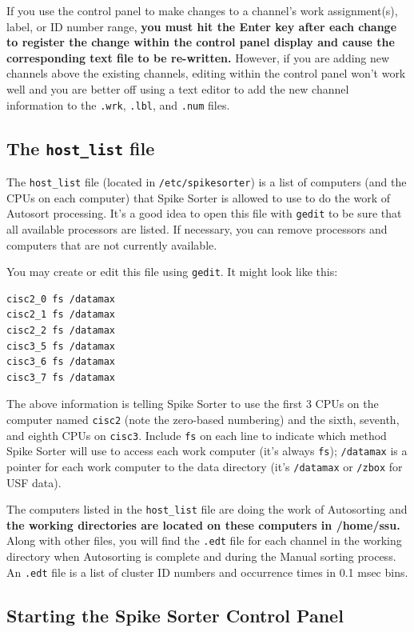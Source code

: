\documentclass[12pt]{article}
\begin{document}
If you use the control panel to make changes to a channel's work
assignment(s), label, or ID number range, \textbf{you must hit the
  Enter key after each change to register the change within the
  control panel display and cause the corresponding text file to be
  re-written.} However, if you are adding new channels above the
existing channels, editing within the control panel won't work well
and you are better off using a text editor to add the new channel
information to the {\tt .wrk}, {\tt .lbl}, and {\tt .num} files.

\subsection {The {\tt host\_list} file}

The {\tt host\_list} file (located in {\tt /etc/spikesorter}) is a
list of computers (and the CPUs on each computer) that Spike Sorter is
allowed to use to do the work of Autosort processing. It's a good idea
to open this file with {\tt gedit} to be sure that all available
processors are listed. If necessary, you can remove processors and
computers that are not currently available.

You may create or edit this file using {\tt gedit}. It might look like
this:
\begin{verbatim}
cisc2_0 fs /datamax
cisc2_1 fs /datamax
cisc2_2 fs /datamax
cisc3_5 fs /datamax
cisc3_6 fs /datamax
cisc3_7 fs /datamax
\end{verbatim}

The above information is telling Spike Sorter to use the first 3 CPUs
on the computer named {\tt cisc2} (note the zero-based numbering) and
the sixth, seventh, and eighth CPUs on {\tt cisc3}. Include {\tt fs}
on each line to indicate which method Spike Sorter will use to access
each work computer (it's always {\tt fs}); {\tt /datamax} is a pointer
for each work computer to the data directory (it's {\tt /datamax} or
{\tt /zbox} for USF data).

The computers listed in the {\tt host\_list} file are doing the work
of Autosorting and {\bfseries the working directories are located on
  these computers in {\ttfamily /home/ssu}.  } Along with other files,
you will find the {\tt .edt} file for each channel in the working
directory when Autosorting is complete and during the Manual sorting
process. An {\tt .edt} file is a list of cluster ID numbers and
occurrence times in 0.1 msec bins.

\subsection{Starting the Spike Sorter Control Panel}
\end{document}
